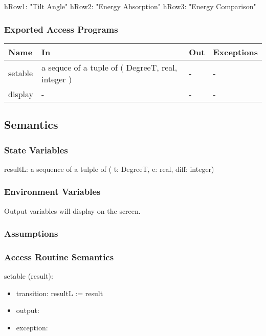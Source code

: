 \documentclass[12pt, titlepage]{article}
\begin{document}
hRow1: "Tilt Angle"
hRow2: "Energy Absorption"
hRow3: "Energy Comparison"

\subsubsection{Exported Access Programs}

\begin{center}
\begin{tabular}{p{2cm} p{5cm} p{5cm} p{2cm}}
\hline
\textbf{Name} & \textbf{In} & \textbf{Out} & \textbf{Exceptions} \\
\hline 
setable & a sequce of a tuple of ( DegreeT, real, integer ) & - & - \\
display & - & - & - \\

\hline
\end{tabular}
\end{center}


\subsection{Semantics}

\subsubsection{State Variables}

resultL: a sequence of a tulple of ( t: DegreeT, e: real, diff: integer)\\

\subsubsection{Environment Variables}
Output variables will display on the screen. 

\subsubsection{Assumptions}


\subsubsection{ Access Routine Semantics}

\noindent  setable (result):
\begin{itemize}
\item transition: resultL := result
\item output:
\item exception: 
\end{itemize}
\end{document}
